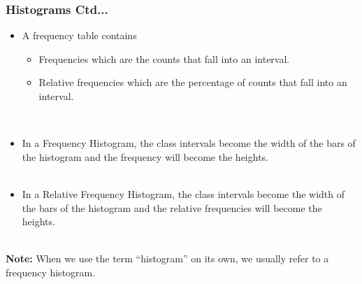 \documentclass[xcolor=svgnames, compress]{beamer}
\begin{document}

\begin{frame}[t]
\frametitle{Histograms Ctd...}

\vspace{-0.25cm}

\begin{itemize}
\justifying
\item	A \alert{frequency table} contains 
	\begin{itemize}
	\item	\alert{Frequencies} which are the counts that fall into an interval.	\\
	\item	\alert{Relative frequencies} which are the \alert{percentage} of counts that fall into an interval.	\\
	\end{itemize}
\hfill\\
\item	In a \alert{Frequency Histogram}, the class intervals become the width of the bars of the histogram and the \alert{frequency} will become the heights.\\
\hfill\\
\item In a \alert{Relative Frequency Histogram}, the class intervals become the width of the bars of the histogram and the \alert{relative frequencies} will become the heights.\\
\end{itemize}
\hfill\\
\vspace{0.1cm}
\justifying
\textbf{Note:} When we use the term ``histogram'' on its own, we usually refer to a frequency histogram.

\end{frame}





\end{document}
